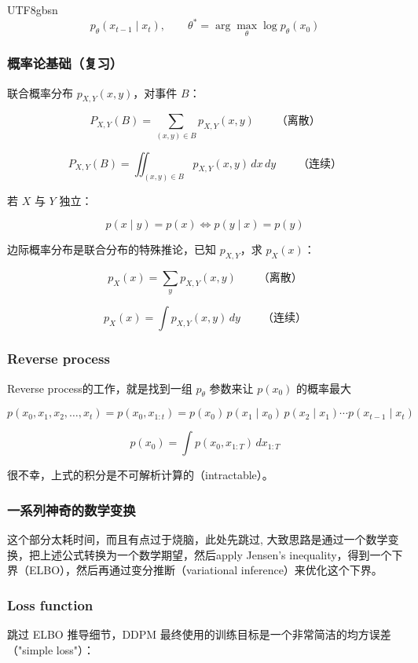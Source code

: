 \documentclass{article}
\begin{document}
\begin{CJK}{UTF8}{gbsn}
\[
p_\theta(x_{t-1} \mid x_t), \qquad \theta^* = \arg\max_{\theta} \log p_\theta(x_0)
\]

\subsubsection{概率论基础（复习）}

联合概率分布 $p_{X,Y}(x,y)$，对事件 $B$：

\[
P_{X,Y}(B) = \sum_{(x,y) \in B} p_{X,Y}(x,y) \qquad \text{（离散）}
\]

\[
P_{X,Y}(B) = \iint_{(x,y) \in B} p_{X,Y}(x,y)\, dx\, dy \qquad \text{（连续）}
\]

若 $X$ 与 $Y$ 独立：

\[
p(x \mid y) = p(x) \iff p(y \mid x) = p(y)
\]

边际概率分布是联合分布的特殊推论，已知 $p_{X,Y}$，求 $p_X(x)$：

\[
p_X(x) = \sum_{y} p_{X,Y}(x,y) \qquad \text{（离散）}
\]

\[
p_X(x) = \int p_{X,Y}(x,y)\, dy \qquad \text{（连续）}
\]

\subsubsection{Reverse process}

Reverse process的工作，就是找到一组 $p_\theta$ 参数来让 $p(x_0)$ 的概率最大

\[
p(x_0, x_1, x_2, \ldots, x_t) = p(x_0, x_{1:t}) = p(x_0)\, p(x_1 \mid x_0)\, p(x_2 \mid x_1) \cdots p(x_{t-1} \mid x_t)
\]

\[
p(x_0) = \int p(x_0, x_{1:T})\, dx_{1:T}
\]

很不幸，上式的积分是不可解析计算的（intractable）。

\subsubsection{一系列神奇的数学变换}
这个部分太耗时间，而且有点过于烧脑，此处先跳过, 大致思路是通过一个数学变换，把上述公式转换为一个数学期望，然后apply Jensen's inequality，得到一个下界（ELBO），然后再通过变分推断（variational inference）来优化这个下界。

\subsubsection{Loss function}

跳过 ELBO 推导细节，DDPM 最终使用的训练目标是一个非常简洁的均方误差（"simple loss"）：


\end{CJK}
\end{document}
